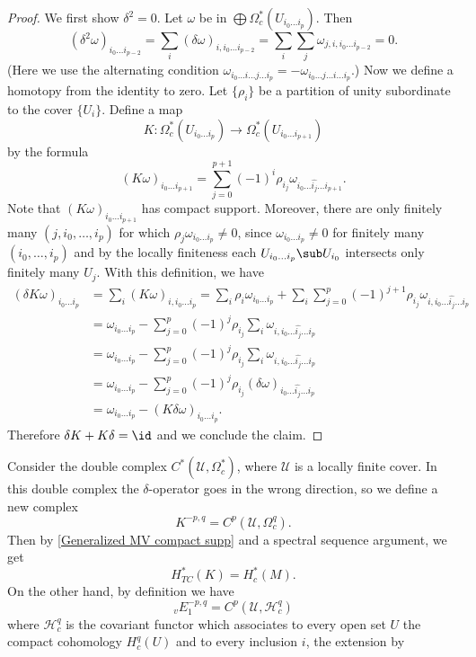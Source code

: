 \begin{proof}
We first show $\delta^2=0$. Let $\omega$ be in $\bigoplus\Omega^*_c(U_{i_0\dots i_p})$. Then
\[(\delta^2\omega)_{i_0\dots i_{p-2}}=\sum_i(\delta\omega)_{i,i_0\dots i_{p-2}}=\sum_i\sum_j\omega_{j,i,i_0\dots i_{p-2}}=0.\]
(Here we use the alternating condition $\omega_{i_0\dots i\dots j\dots i_p}=-\omega_{i_0\dots j\dots i\dots i_p}$.) Now we define a homotopy from the identity to zero. 
Let $\{\rho_i\}$ be a partition of unity subordinate to the cover $\{U_i\}$. Define a map
\[K:\Omega^*_c(U_{i_0\dots i_p})\to\Omega^*_c(U_{i_0\dots i_{p+1}})\]
by the formula
\[(K\omega)_{i_0\dots i_{p+1}}=\sum_{j=0}^{p+1}(-1)^i\rho_{i_j}\omega_{i_0\dots\widehat{i_j}\dots i_{p+1}}.\]
Note that $(K\omega)_{i_0\dots i_{p+1}}$ has compact support. Moreover, there are only finitely many $(j,i_0,\dots,i_p)$ for which $\rho_j\omega_{i_0\dots i_p}\neq 0$, 
since $\omega_{i_0\dots i_p}\neq 0$ for finitely many $(i_0,\dots,i_p)$ and by the locally finiteness each $U_{i_0\dots i_p}\sub U_{i_0}$ intersects only finitely many 
$U_j$. With this definition, we have
\begin{align*}
(\delta K\omega)_{i_0\dots i_p}&=\sum_i(K\omega)_{i,i_0\dots i_{p}}=\sum_i\rho_{i}\omega_{i_0\dots i_{p}}+\sum_i\sum_{j=0}^{p}(-1)^{j+1}\rho_{i_j}\omega_{i,i_0\dots\widehat{i_{j}}\dots i_{p}}\\
&=\omega_{i_0\dots i_p}-\sum_{j=0}^{p}(-1)^j\rho_{i_j}\sum_i\omega_{i,i_0\dots\widehat{i_{j}}\dots i_{p}}\\
&=\omega_{i_0\dots i_p}-\sum_{j=0}^{p}(-1)^j\rho_{i_j}\sum_i\omega_{i,i_0\dots\widehat{i_{j}}\dots i_{p}}\\
&=\omega_{i_0\dots i_p}-\sum_{j=0}^{p}(-1)^j\rho_{i_j}(\delta\omega)_{i_0\dots\widehat{i_{j}}\dots i_{p}}\\
&=\omega_{i_0\dots i_p}-(K\delta\omega)_{i_0\dots i_p}.
\end{align*}
Therefore $\delta K+K\delta=\id$ and we conclude the claim.
\end{proof}
Consider the double complex $C^*(\mathcal{U},\Omega^*_c)$, where $\mathcal{U}$ is a locally finite cover. In this double complex the $\delta$-operator goes in the wrong 
direction, so we define a new complex
\[K^{-p,q}=C^p(\mathcal{U},\Omega^q_c).\]
Then by \cref{Generalized MV compact supp} and a spectral sequence argument, we get
\[H_{TC}^*(K)=H_c^*(M).\]
On the other hand, by definition we have
\[_{v}E_1^{-p,q}=C^p(\mathcal{U},\mathscr{H}_c^q)\]
where $\mathscr{H}_c^q$ is the covariant functor which associates to every open set $U$ the compact cohomology $H^q_c(U)$ and to every inclusion $i$, the extension by 
